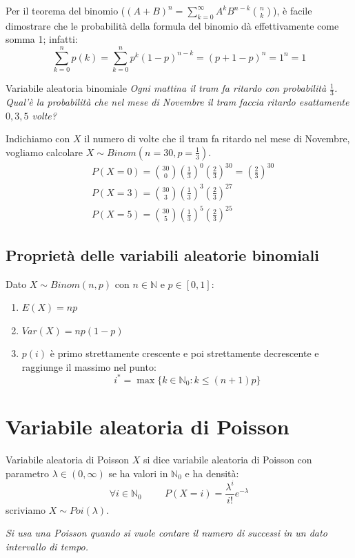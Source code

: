 Per il teorema del binomio ($(A+B)^n=\sum_{k=0}^\infty A^kB^{n-k}\binom{n}{k}$), è facile dimostrare che le probabilità della formula  del binomio dà effettivamente come somma 1; infatti:
\begin{equation*}
    \sum_{k=0}^np(k)=\sum_{k=0}^np^k(1-p)^{n-k}=(p+1-p)^n=1^n=1
\end{equation*}

\begin{Example}{Variabile aleatoria binomiale}{}
    \textit{Ogni mattina il tram fa ritardo con probabilità $\frac{1}{3}$. Qual'è la probabilità che nel mese di Novembre il tram faccia ritardo esattamente $0,3,5$ volte?}

    Indichiamo con $X$ il numero di volte che il tram fa ritardo nel mese di Novembre, vogliamo calcolare $X\sim Binom(n=30, p=\frac{1}{3})$.
    \begin{align*}
        &P(X=0)=\binom{30}{0}(\frac{1}{3})^0(\frac{2}{3})^{30}=(\frac{2}{3})^{30}\\
        &P(X=3)=\binom{30}{3}(\frac{1}{3})^3(\frac{2}{3})^{27}\\
        &P(X=5)=\binom{30}{5}(\frac{1}{3})^5(\frac{2}{3})^{25}
    \end{align*}
\end{Example}

\subsection*{Proprietà delle variabili aleatorie binomiali}
Dato $X\sim Binom(n,p)$ con $n\in\mathbb{N}$ e $p\in[0,1]$:
\begin{enumerate}
    \item $E(X)=np$
    \item $Var(X)=np(1-p)$
    \item $p(i)$ è primo strettamente crescente e poi strettamente decrescente e raggiunge il massimo nel punto:
    \begin{equation*}
        i^*=\max\{k\in\mathbb{N}_0:k\leq (n+1)p\}
    \end{equation*}
\end{enumerate}

\section{Variabile aleatoria di Poisson}
\begin{Definition}{Variabile aleatoria di Poisson}{}
    $X$ si dice variabile aleatoria di Poisson con parametro $\lambda\in(0,\infty)$ se ha valori in $\mathbb{N}_0$ e ha densità:
    \begin{equation*}
        \forall i\in\mathbb{N}_0\hspace{1cm}P(X=i)=\frac{\lambda^i}{i!}e^{-\lambda}
    \end{equation*}
    scriviamo $X\sim Poi(\lambda)$. 
    
    \textit{Si usa una Poisson quando si vuole contare il numero di successi in un dato intervallo di tempo.}
\end{Definition}

